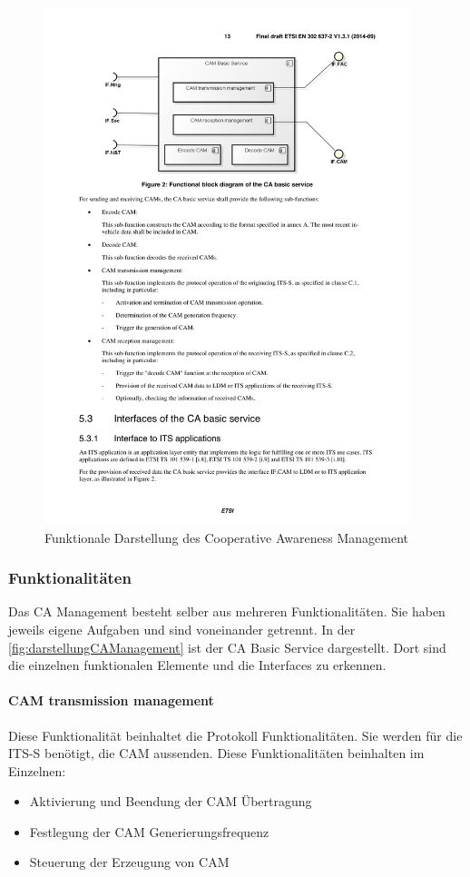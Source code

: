 \begin{figure}[htbp]
	\includegraphics[width=0.95\textwidth]{content/images/04_facilitylayer/caManagementLAyerUebersicht.pdf}
	\caption{Funktionale Darstellung des Cooperative Awareness Management}
	\label{fig:darstellungCAManagement}
\end{figure}

\subsubsection{Funktionalitäten}
Das \ac{CA} Management besteht selber aus mehreren Funktionalitäten. Sie haben jeweils eigene Aufgaben und sind voneinander getrennt. In der \autoref{fig:darstellungCAManagement} ist der \ac{CA} Basic Service dargestellt. Dort sind die einzelnen funktionalen Elemente und die Interfaces zu erkennen.

\paragraph{CAM transmission management}
Diese Funktionalität beinhaltet die Protokoll Funktionalitäten. Sie werden für die \ac{ITS-S} benötigt, die \ac{CAM} aussenden. Diese Funktionalitäten beinhalten im Einzelnen:
\begin{itemize}
	\item Aktivierung und Beendung der \ac{CAM} Übertragung
	\item Festlegung der \ac{CAM} Generierungsfrequenz 
	\item Steuerung der Erzeugung von \ac{CAM}
\end{itemize}

